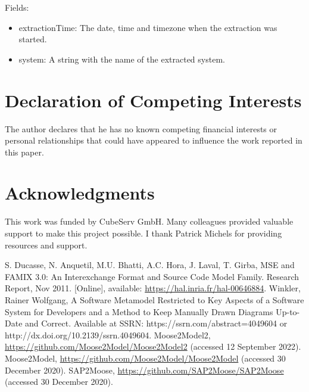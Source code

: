 \documentclass[preprint,12pt]{elsarticle}
\begin{document}
Fields:
\begin{itemize}
\item extractionTime: The date, time and timezone when the extraction was started.
\item system: A string with the name of the extracted system.
\end{itemize}


\section*{Declaration of Competing Interests} 
The author declares that he has no known competing financial interests or personal relationships that could have appeared to influence the work reported in this paper.

\section*{Acknowledgments}

This work was funded by CubeServ GmbH.
Many colleagues provided valuable support to make this project possible.
I thank
Patrick Michels for providing resources and support.



\begin{thebibliography}{00}
S. Ducasse, N. Anquetil, M.U. Bhatti, A.C. Hora, J. Laval, T. Girba, MSE and FAMIX 3.0: An Interexchange Format and Source Code Model Family. Research Report, Nov 2011. [Online], available: \url{https://hal.inria.fr/hal-00646884}.
Winkler, Rainer Wolfgang, A Software Metamodel Restricted to Key Aspects of a Software System for Developers and a Method to Keep Manually Drawn Diagrams Up-to-Date and Correct. Available at SSRN: https://ssrn.com/abstract=4049604 or http://dx.doi.org/10.2139/ssrn.4049604.
Moose2Model2, \url{https://github.com/Moose2Model/Moose2Model2} (accessed 12 September 2022).
Moose2Model, \url{https://github.com/Moose2Model/Moose2Model} (accessed 30 December 2020).
SAP2Moose, \url{https://github.com/SAP2Moose/SAP2Moose} (accessed 30 December 2020).

\end{thebibliography}
\end{document}

